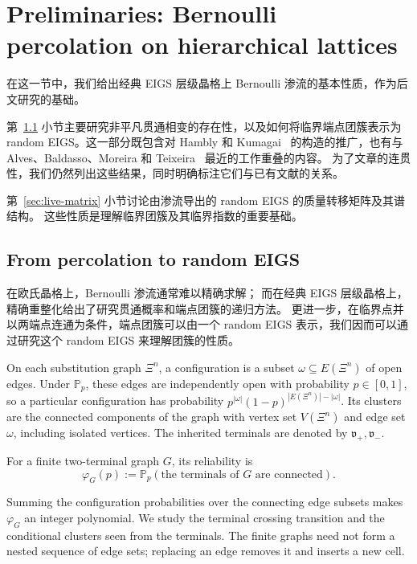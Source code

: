 \section{Preliminaries: Bernoulli percolation on hierarchical lattices}\label{sec:bernoulli}

在这一节中，我们给出经典 EIGS 层级晶格上 Bernoulli 渗流的基本性质，作为后文研究的基础。

第~\ref{sec:percolation-preliminaries} 小节主要研究非平凡贯通相变的存在性，以及如何将临界端点团簇表示为 random EIGS。这一部分既包含对 Hambly 和 Kumagai~\cite{hambly2010diffusion} 的构造的推广，也有与 Alves、Baldasso、Moreira 和 Teixeira~\cite{alves2026percolation} 最近的工作重叠的内容。
为了文章的连贯性，我们仍然列出这些结果，同时明确标注它们与已有文献的关系。

第~\ref{sec:live-matrix} 小节讨论由渗流导出的 random EIGS 的质量转移矩阵及其谱结构。
这些性质是理解临界团簇及其临界指数的重要基础。


\subsection{From percolation to random EIGS}\label{sec:percolation-preliminaries}

在欧氏晶格上，Bernoulli 渗流通常难以精确求解；
而在经典 EIGS 层级晶格上，精确重整化给出了研究贯通概率和端点团簇的递归方法。
更进一步，在临界点并以两端点连通为条件，端点团簇可以由一个 random EIGS 表示，我们因而可以通过研究这个 random EIGS 来理解团簇的性质。

\begin{definition}\label{def:bernoulli}
On each substitution graph $\Xi^n$, a configuration is a subset $\omega\subseteq E(\Xi^n)$ of open edges. Under $\mathbb P_p$, these edges are independently open with probability $p\in[0,1]$, so a particular configuration has probability $p^{|\omega|}(1-p)^{|E(\Xi^n)|-|\omega|}$. Its clusters are the connected components of the graph with vertex set $V(\Xi^n)$ and edge set $\omega$, including isolated vertices. The inherited terminals are denoted by $\mathfrak v_+,\mathfrak v_-$.

For a finite two-terminal graph $G$, its reliability is
\[
 \varphi_G(p):=\mathbb P_p(\text{the terminals of }G\text{ are connected}).
\]
\end{definition}
Summing the configuration probabilities over the connecting edge subsets makes $\varphi_G$ an integer polynomial. We study the terminal crossing transition and the conditional clusters seen from the terminals. The finite graphs need not form a nested sequence of edge sets; replacing an edge removes it and inserts a new cell.



